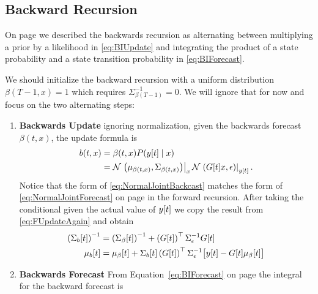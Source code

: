 \subsection{Backward Recursion}
\label{sec:DetailBack}

On page \pageref{eq:BIUpdate} we described the backwards recursion as
alternating between multiplying a prior by a likelihood in
\eqref{eq:BIUpdate} and integrating the product of a state probability
and a state transition probability in \eqref{eq:BIForecast}.

We should initialize the backward recursion with a uniform
distribution $\beta(T-1,x) = 1$ which requires
$\Sigma^{-1}_{\beta(T-1)} = 0$.  We will ignore that for now and focus
on the two alternating steps:
\begin{enumerate}
\item \textbf{Backwards Update} ignoring normalization, given the
  backwards forecast $\beta(t,x)$, the update formula is
  \begin{align}
    \nonumber
    b(t,x) &= \beta(t,x) P(y[t] \mid x) \\
    \label{eq:NormalJointBackcast}
           &= {\mathcal{N}}\left.\left(\mu_{\beta(t,x)},\Sigma_{\beta(t,x)}\right)\right|_{x} {\mathcal{N}}\left.\left(G[t]x,\epsilon\right)\right|_{{y}{[t]}}. 
  \end{align}
  Notice that the form of \eqref{eq:NormalJointBackcast} matches the
  form of \eqref{eq:NormalJointForecast} on page
  \pageref{eq:NormalJointForecast} in the forward recursion.  After
  taking the conditional given the actual value of ${y}{[t]}$ we copy
  the result from \eqref{eq:FUpdateAgain} and obtain
  \begin{subequations}
    \label{eq:BUpdateAgain}
    \begin{align}
      \left( {\Sigma_b}{[t]} \right)^{-1} &= \left(
        {\Sigma_\beta}{[t]} \right)^{-1} + \left( {G}{[t]}
        \right)^\top \Sigma_\epsilon^{-1} {G}{[t]} \\
      {\mu_b}{[t]} &= {\mu_\beta}{[t]} +
      {\Sigma_{b}}{[t]} \left( {G}{[t]} \right)^\top
      \Sigma_\epsilon^{-1} \big[{y}{[t]} - {G}{[t]}
      {\mu_\beta}{[t]}\big]
    \end{align}
  \end{subequations}
  \item \textbf{Backwards Forecast} From
    Equation~\eqref{eq:BIForecast} on page \pageref{eq:BIForecast} the
    integral for the backward forecast is
    \begin{equation}

\end{equation}
\end{enumerate}
